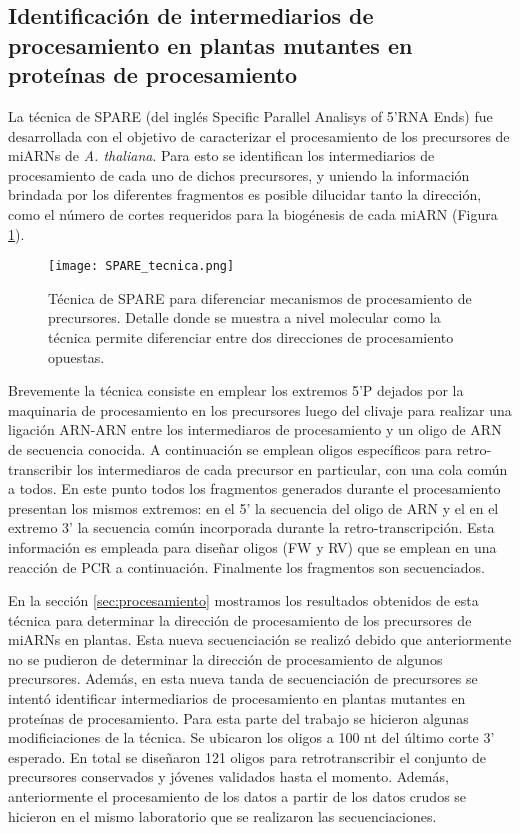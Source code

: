 \subsection{Identificación de intermediarios de procesamiento en plantas mutantes en proteínas de procesamiento}

La técnica de SPARE (del inglés Specific Parallel Analisys of 5'RNA Ends) fue desarrollada con el objetivo de caracterizar el procesamiento de los precursores de miARNs de \textit{A. thaliana}.
Para esto se identifican los intermediarios de procesamiento de cada uno de dichos precursores, y uniendo la información brindada por los diferentes fragmentos es posible dilucidar tanto la dirección, como el número de cortes requeridos para la biogénesis de cada miARN (Figura \ref{fig:SPARE_tecnica}).

\begin{figure}[htbp!] 
	\centering    
	\texttt{[image: SPARE\_tecnica.png]}
	\caption[Técnica de SPARE]{Técnica de SPARE para diferenciar mecanismos de procesamiento de precursores.
	Detalle donde se muestra a nivel molecular como la técnica permite diferenciar entre dos direcciones de procesamiento opuestas. }
	 \label{fig:SPARE_tecnica}
\end{figure}

Brevemente la técnica consiste en emplear los extremos 5'P dejados por la maquinaria de procesamiento en los precursores luego del clivaje para realizar una ligación ARN-ARN entre los intermediaros de procesamiento y un oligo de ARN de secuencia conocida.
A continuación se emplean oligos específicos para retro-transcribir los intermediaros de cada precursor en particular, con una cola común a todos.
En este punto todos los fragmentos generados durante el procesamiento presentan los mismos extremos: en el 5' la secuencia del oligo de ARN y el en el extremo 3' la secuencia común incorporada durante la retro-transcripción.
Esta información es empleada para diseñar oligos (FW y RV) que se emplean en una reacción de PCR a continuación.
Finalmente los fragmentos son secuenciados. 

En la sección \ref{sec:procesamiento} mostramos los resultados obtenidos de esta técnica para determinar la dirección de procesamiento de los precursores de miARNs en plantas.
Esta nueva secuenciación se realizó debido que anteriormente no se pudieron de determinar la dirección de procesamiento de algunos precursores.
Además, en esta nueva tanda de secuenciación de precursores se intentó identificar intermediarios de procesamiento en plantas mutantes en proteínas de procesamiento.  
Para esta parte del trabajo se hicieron algunas modificiaciones de la técnica.
Se ubicaron los oligos a 100 nt del último corte 3' esperado.
En total se diseñaron 121 oligos para retrotranscribir el conjunto de precursores conservados y jóvenes validados hasta el momento.  
Además, anteriormente el procesamiento de los datos a partir de los datos crudos se hicieron en el mismo laboratorio que se realizaron las secuenciaciones.

